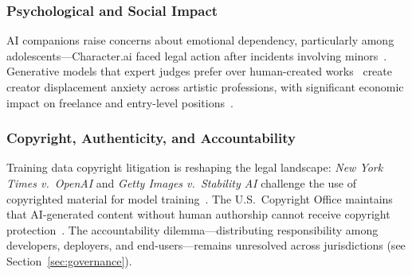 \subsubsection{Psychological and Social Impact}
\label{sec:threat-psych}

AI companions raise concerns about emotional dependency, particularly among adolescents---Character.ai faced legal action after incidents involving minors~\cite{characterai2024}. Generative models that expert judges prefer over human-created works~\cite{chi2026creative} create creator displacement anxiety across artistic professions, with significant economic impact on freelance and entry-level positions~\cite{aisafetyreport2026}.


\subsubsection{Copyright, Authenticity, and Accountability}
\label{sec:threat-copyright}

Training data copyright litigation is reshaping the legal landscape: \emph{New York Times v.\ OpenAI} and \emph{Getty Images v.\ Stability AI} challenge the use of copyrighted material for model training~\cite{nytvopenai2023,gettyvstability2023}. The U.S.\ Copyright Office maintains that AI-generated content without human authorship cannot receive copyright protection~\cite{usco2023}. The accountability dilemma---distributing responsibility among developers, deployers, and end-users---remains unresolved across jurisdictions (see Section~\ref{sec:governance}).

\begin{figure}[htbp]
\centering
{}
\end{figure}

